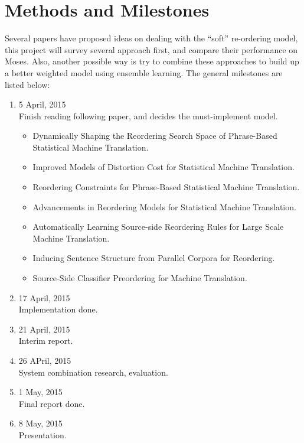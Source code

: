 \documentclass[11pt]{article}
\begin{document}
\section{Methods and Milestones} %
\label{sec:Methods and Milestones}
Several papers have proposed ideas on dealing with the ``soft'' re-ordering model, this project will survey several approach first, and compare their performance on Moses. Also, another possible way is try to combine these approaches to build up a better weighted model using ensemble learning. 
The general milestones are listed below:
\begin{enumerate}
	\item 5 April, 2015\\
	Finish reading following paper, and decides the must-implement model.
	\begin{itemize}
		\item Dynamically Shaping the Reordering Search Space of Phrase-Based Statistical Machine Translation.\cite{dshape}
		\item Improved Models of Distortion Cost for Statistical Machine Translation.\cite{dc}
		\item Reordering Constraints for Phrase-Based Statistical Machine Translation.\cite{rc}
		\item Advancements in Reordering Models for Statistical Machine Translation.\cite{ar}
		\item Automatically Learning Source-side Reordering Rules for Large Scale Machine Translation.\cite{al}
		\item Inducing Sentence Structure from Parallel Corpora for Reordering.\cite{id}
		\item Source-Side Classifier Preordering for Machine Translation.\cite{ss}
	\end{itemize}
	\item 17 April, 2015\\
	Implementation done.
	\item 21 April, 2015\\
	Interim report.
	\item 26 APril, 2015\\
	System combination research, evaluation.
	\item 1 May, 2015\\
	Final report done.
	\item 8 May, 2015\\
	Presentation.
\end{enumerate}
\end{document}
